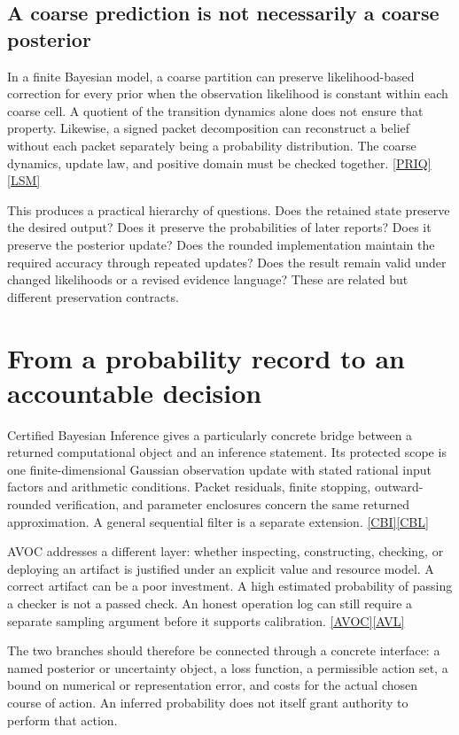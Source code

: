 \documentclass[11pt,oneside]{article}
\newcommand{\src}[1]{\hyperlink{cat:#1}{\textsf{[#1]}}}
\begin{document}
\subsection{A coarse prediction is not necessarily a coarse posterior}
In a finite Bayesian model, a coarse partition can preserve likelihood-based correction for every prior when the observation likelihood is constant within each coarse cell. A quotient of the transition dynamics alone does not ensure that property. Likewise, a signed packet decomposition can reconstruct a belief without each packet separately being a probability distribution. The coarse dynamics, update law, and positive domain must be checked together. \src{PRIQ}\src{LSM}

This produces a practical hierarchy of questions. Does the retained state preserve the desired output? Does it preserve the probabilities of later reports? Does it preserve the posterior update? Does the rounded implementation maintain the required accuracy through repeated updates? Does the result remain valid under changed likelihoods or a revised evidence language? These are related but different preservation contracts.

\section{From a probability record to an accountable decision}
Certified Bayesian Inference gives a particularly concrete bridge between a returned computational object and an inference statement. Its protected scope is one finite-dimensional Gaussian observation update with stated rational input factors and arithmetic conditions. Packet residuals, finite stopping, outward-rounded verification, and parameter enclosures concern the same returned approximation. A general sequential filter is a separate extension. \src{CBI}\src{CBL}

AVOC addresses a different layer: whether inspecting, constructing, checking, or deploying an artifact is justified under an explicit value and resource model. A correct artifact can be a poor investment. A high estimated probability of passing a checker is not a passed check. An honest operation log can still require a separate sampling argument before it supports calibration. \src{AVOC}\src{AVL}

The two branches should therefore be connected through a concrete interface: a named posterior or uncertainty object, a loss function, a permissible action set, a bound on numerical or representation error, and costs for the actual chosen course of action. An inferred probability does not itself grant authority to perform that action.
\end{document}
